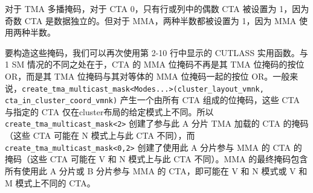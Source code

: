对于 TMA 多播掩码，对于 CTA 0，只有行或列中的偶数 CTA 被设置为 1，因为奇数 CTA 是数据独立的。但对于 MMA，两种半数都被设置为 1，因为 MMA 使用两种半数。

要构造这些掩码，我们可以再次使用第 2-10 行中显示的 CUTLASS 实用函数。与 1 SM 情况的不同之处在于，CTA 的 MMA 位掩码不再是其 TMA 位掩码的按位 OR，而是其 TMA 位掩码与其对等体的 MMA 位掩码一起的按位 OR。一般来说，\texttt{c\allowbreak{}r\allowbreak{}e\allowbreak{}a\allowbreak{}t\allowbreak{}e\allowbreak{}\_\allowbreak{}t\allowbreak{}m\allowbreak{}a\allowbreak{}\_\allowbreak{}m\allowbreak{}u\allowbreak{}l\allowbreak{}t\allowbreak{}i\allowbreak{}c\allowbreak{}a\allowbreak{}s\allowbreak{}t\allowbreak{}\_\allowbreak{}m\allowbreak{}a\allowbreak{}s\allowbreak{}k\allowbreak{}<\allowbreak{}M\allowbreak{}o\allowbreak{}d\allowbreak{}e\allowbreak{}s\allowbreak{}.\allowbreak{}.\allowbreak{}.\allowbreak{}>\allowbreak{}(\allowbreak{}c\allowbreak{}l\allowbreak{}u\allowbreak{}s\allowbreak{}t\allowbreak{}e\allowbreak{}r\allowbreak{}\_\allowbreak{}l\allowbreak{}a\allowbreak{}y\allowbreak{}o\allowbreak{}u\allowbreak{}t\allowbreak{}\_\allowbreak{}v\allowbreak{}m\allowbreak{}n\allowbreak{}k\allowbreak{},\allowbreak{} \allowbreak{}c\allowbreak{}t\allowbreak{}a\allowbreak{}\_\allowbreak{}i\allowbreak{}n\allowbreak{}\_\allowbreak{}c\allowbreak{}l\allowbreak{}u\allowbreak{}s\allowbreak{}t\allowbreak{}e\allowbreak{}r\allowbreak{}\_\allowbreak{}c\allowbreak{}o\allowbreak{}o\allowbreak{}r\allowbreak{}d\allowbreak{}\_\allowbreak{}v\allowbreak{}m\allowbreak{}n\allowbreak{}k\allowbreak{})} 产生一个由所有 CTA 组成的位掩码，这些 CTA 与指定的 CTA 仅在cluster布局的给定模式上不同。所以 \texttt{c\allowbreak{}r\allowbreak{}e\allowbreak{}a\allowbreak{}t\allowbreak{}e\allowbreak{}\_\allowbreak{}t\allowbreak{}m\allowbreak{}a\allowbreak{}\_\allowbreak{}m\allowbreak{}u\allowbreak{}l\allowbreak{}t\allowbreak{}i\allowbreak{}c\allowbreak{}a\allowbreak{}s\allowbreak{}t\allowbreak{}\_\allowbreak{}m\allowbreak{}a\allowbreak{}s\allowbreak{}k\allowbreak{}<\allowbreak{}2\allowbreak{}>} 创建了参与此 A 分片 TMA 加载的 CTA 的掩码（这些 CTA 可能在 N 模式上与此 CTA 不同），而 \texttt{c\allowbreak{}r\allowbreak{}e\allowbreak{}a\allowbreak{}t\allowbreak{}e\allowbreak{}\_\allowbreak{}t\allowbreak{}m\allowbreak{}a\allowbreak{}\_\allowbreak{}m\allowbreak{}u\allowbreak{}l\allowbreak{}t\allowbreak{}i\allowbreak{}c\allowbreak{}a\allowbreak{}s\allowbreak{}t\allowbreak{}\_\allowbreak{}m\allowbreak{}a\allowbreak{}s\allowbreak{}k\allowbreak{}<\allowbreak{}0\allowbreak{},\allowbreak{}2\allowbreak{}>} 创建了使用此 A 分片参与 MMA 的 CTA 的掩码（这些 CTA 可能在 V 和 N 模式上与此 CTA 不同）。MMA 的最终掩码包含所有使用此 A 分片或 B 分片参与 MMA 的 CTA，即可能在 V 和 N 模式或 V 和 M 模式上不同的 CTA。

